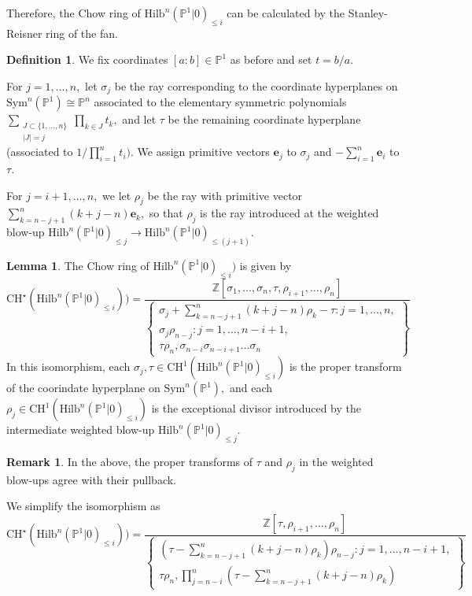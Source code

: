 \documentclass[10.5pt]{amsart}
\theoremstyle{definition}
\theoremstyle{definition}
\theoremstyle{definition}
\theoremstyle{definition}
\newtheorem{lemma}[theorem]{Lemma}
\newtheorem{remark}[theorem]{Remark}
\newtheorem{definition}[theorem]{Definition}
\newcommand{\Hilb}{\mathrm{Hilb}}
\newcommand{\Sym}{\mathrm{Sym}}
\begin{document}
Therefore, the Chow ring of $\Hilb^n(\mathbb{P}^1|0)_{\leq i}$ can be calculated by the Stanley-Reisner ring of the fan.

\begin{definition}
   We fix coordinates $[a:b]\in \mathbb{P}^1$ as before and set $t=b/a.$ 
   
   For $j=1,\dots,n,$ let $\sigma_{j}$ be the ray corresponding to the coordinate hyperplanes on $\Sym^n(\mathbb{P}^1)\cong \mathbb{P}^n$ associated to the elementary symmetric polynomials $\sum_{\substack{J\subset \{1,\dots,n\}\\ |J|=j}}\prod_{k\in J}t_{k},$ and let $\tau$ be the remaining coordinate hyperplane (associated to $1/\prod_{i=1}^n t_i).$ We assign primitive vectors $\mathbf{e}_j$ to $\sigma_j$ and $-\sum_{i=1}^n \mathbf{e}_i$ to $\tau.$

   For $j = i+1,\dots, n,$ we let $\rho_j$ be the ray with primitive vector $\sum_{k = n-j+1}^n (k+j-n)\mathbf{e}_{k},$ so that $\rho_j$ is the ray introduced at the weighted blow-up $\Hilb^n(\mathbb{P}^1|0)_{\leq j}\to \Hilb^n(\mathbb{P}^1|0)_{\leq (j+1)}.$
\end{definition}

\begin{lemma}
    The Chow ring of $\Hilb^n(\mathbb{P}^1|0)_{\leq i})$ is given by $$\mathrm{CH}^\star(\Hilb^n(\mathbb{P}^1|0)_{\leq i})) = \frac{\mathbb{Z}[\sigma_1,\dots,\sigma_n, \tau, \rho_{i+1},\dots, \rho_{n}]}{\left\{\begin{array}{c}\sigma_{j} + \sum_{k = n-j+1}^{n}(k+j-n)\rho_k-\tau: j = 1,\dots, n, \\  \sigma_j\rho_{n-j}: j = 1,\dots, n-i+1, \\ \tau\rho_n, \sigma_{n-i}\sigma_{n-i+1}\dots\sigma_{n}\end{array}\right\}}$$
    In this isomorphism, each $\sigma_j,\tau\in \mathrm{CH}^1(\Hilb^n(\mathbb{P}^1|0)_{\leq i})$ is the proper transform of the coorindate hyperplane on $\Sym^n(\mathbb{P}^1),$ and each $\rho_j\in \mathrm{CH}^1(\Hilb^n(\mathbb{P}^1|0)_{\leq i})$ is the exceptional divisor introduced by the intermediate weighted blow-up $\Hilb^n(\mathbb{P}^1|0)_{\leq j}.$ 
\end{lemma}

\begin{remark}
    In the above, the proper transforms of $\tau$  and $\rho_j$ in the weighted blow-ups agree with their pullback.
\end{remark}

{We simplify the isomorphism as}$$\mathrm{CH}^\star(\Hilb^n(\mathbb{P}^1|0)_{\leq i})) = \frac{\mathbb{Z}[\tau, \rho_{i+1},\dots, \rho_{n}]}{\left\{\begin{array}{c} \left(\tau-\sum_{k = n-j+1}^{n}(k+j-n)\rho_k\right)\rho_{n-j}: j = 1,\dots, n-i+1, \\ \tau\rho_n, \prod_{j = n-i}^n (\tau-\sum_{k = n-j+1}^{n}(k+j-n)\rho_k) \end{array}\right\}}$$
\end{document}

